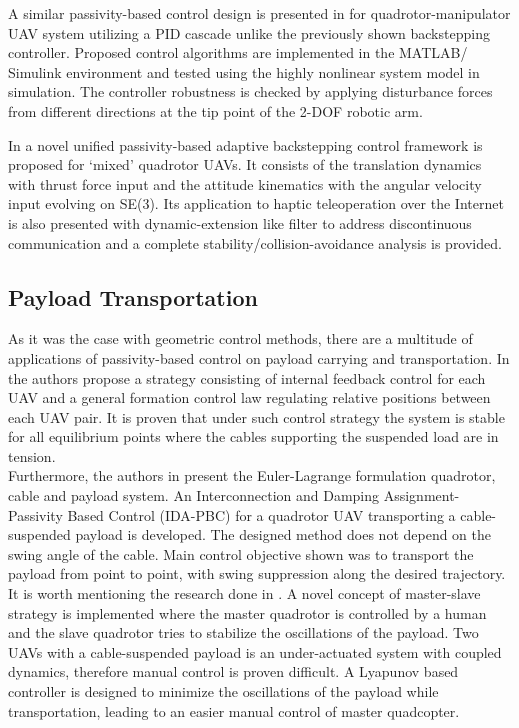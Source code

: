 A similar passivity-based control design is presented in \cite{decoupled-aerial-manipulation} for quadrotor-manipulator UAV system utilizing a PID cascade  unlike the previously shown backstepping controller. Proposed control algorithms are implemented in the MATLAB/
Simulink environment and tested using the highly nonlinear system model in simulation. 
The controller robustness is checked by applying disturbance forces from different 
directions at the tip point of the 2-DOF robotic arm.

In \cite{passivity-backstepping}  a novel unified passivity-based adaptive backstepping control framework is proposed for ‘mixed’ quadrotor UAVs. It consists of the translation dynamics with thrust force input and the attitude kinematics with the angular velocity input evolving on SE(3). Its application to haptic teleoperation over the Internet is also presented with dynamic-extension like filter to address discontinuous communication and a complete stability/collision-avoidance analysis is provided.

\subsection{Payload Transportation}
As it was the case with geometric control methods, there are a multitude of applications of passivity-based control on payload carrying and transportation. In \cite{passivity-based-formation-load} the authors propose a strategy consisting of internal feedback control for each UAV and a general formation control law regulating relative positions between each UAV pair. It is proven that under such control strategy the system is stable for all equilibrium points where the cables supporting the suspended load are in tension. \\
\noindent Furthermore, the authors in \cite{passivity-based-payload-minimum-swing} present the Euler-Lagrange formulation quadrotor, cable and payload system. An Interconnection and Damping Assignment-Passivity Based Control (IDA-PBC) for a quadrotor UAV transporting a cable-suspended payload is developed. The designed method does not depend on the swing angle of the cable. Main control objective shown was to transport the payload from point to point, with swing suppression along the desired trajectory. \\ 
It is worth mentioning the research done in \cite{payload-and-human}. A novel concept of master-slave strategy is implemented where the  master  quadrotor  is  controlled  by a human  and  the slave quadrotor tries to stabilize the oscillations of the payload. Two  UAVs with a cable-suspended  payload  is an under-actuated system with coupled dynamics, therefore manual control is proven difficult. A Lyapunov based  controller is designed to  minimize  the  oscillations  of  the  payload while  transportation,  leading  to  an  easier  manual  control  of master quadcopter.

